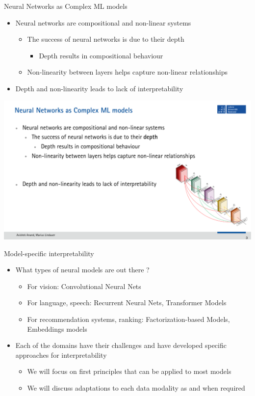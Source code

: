 \documentclass[11pt,compress,t,notes=noshow, aspectratio=169, xcolor=table]{beamer}
\begin{document}
\begin{frame}{Neural Networks as Complex ML models}
	\begin{itemize}
		\item Neural networks are compositional and non-linear systems
		\begin{itemize}
			\item The success of neural networks is due to their depth
			\begin{itemize}
				\item Depth results in compositional behaviour
			\end{itemize}
			\item Non-linearity between layers helps capture non-linear relationships
		\end{itemize}
		\bigskip
		
		\item Depth and non-linearity leads to lack of interpretability
	\end{itemize}

    \hfill
    \includegraphics[width=0.3\linewidth]{img116}

\end{frame}

\begin{frame}[c]{Model-specific interpretability}
	\begin{itemize}
		\item What types of neural models are out there ?
		\begin{itemize}
			\item For vision: Convolutional Neural Nets
			\item For language, speech: Recurrent Neural Nets, Transformer Models
			\item For recommendation systems, ranking: Factorization-based Models, Embeddings
models
		\end{itemize}
		\item Each of the domains have their challenges and have developed specific approaches for
interpretability
		\begin{itemize}
			\item We will focus on first principles that can be applied to most models
			\item We will discuss adaptations to each data modality as and when required
		\end{itemize}
	\end{itemize}
	
\end{frame}
\end{document}
